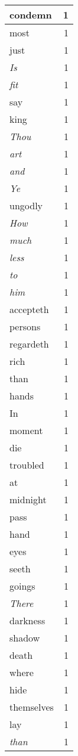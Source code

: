 \begin{center}
\begin{longtable}{l|r}
condemn & 1 \\ \hline
most & 1 \\ \hline
just & 1 \\ \hline
\emph{Is} & 1 \\ \hline
\emph{fit} & 1 \\ \hline
say & 1 \\ \hline
king & 1 \\ \hline
\emph{Thou} & 1 \\ \hline
\emph{art} & 1 \\ \hline
\emph{and} & 1 \\ \hline
\emph{Ye} & 1 \\ \hline
ungodly & 1 \\ \hline
\emph{How} & 1 \\ \hline
\emph{much} & 1 \\ \hline
\emph{less} & 1 \\ \hline
\emph{to} & 1 \\ \hline
\emph{him} & 1 \\ \hline
accepteth & 1 \\ \hline
persons & 1 \\ \hline
regardeth & 1 \\ \hline
rich & 1 \\ \hline
than & 1 \\ \hline
hands & 1 \\ \hline
In & 1 \\ \hline
moment & 1 \\ \hline
die & 1 \\ \hline
troubled & 1 \\ \hline
at & 1 \\ \hline
midnight & 1 \\ \hline
pass & 1 \\ \hline
hand & 1 \\ \hline
eyes & 1 \\ \hline
seeth & 1 \\ \hline
goings & 1 \\ \hline
\emph{There} & 1 \\ \hline
darkness & 1 \\ \hline
shadow & 1 \\ \hline
death & 1 \\ \hline
where & 1 \\ \hline
hide & 1 \\ \hline
themselves & 1 \\ \hline
lay & 1 \\ \hline
\emph{than} & 1 \\ \hline

\end{longtable}
\end{center}
